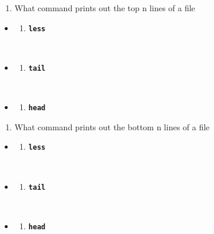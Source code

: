 \documentclass[
  letterpaper,
  DIV=11,
  numbers=noendperiod]{scrreprt}
\providecommand{\tightlist}{%
  \setlength{\itemsep}{0pt}\setlength{\parskip}{0pt}}
\begin{document}
\begin{enumerate}
\def\labelenumi{\arabic{enumi}.}
\setcounter{enumi}{4}
\tightlist
\item
  What command prints out the top n lines of a file
\end{enumerate}

\begin{itemize}
\tightlist
\item
  \begin{enumerate}
  \def\labelenumi{(\Alph{enumi})}
  \tightlist
  \item
    \textbf{\texttt{less}}\strut \\
  \end{enumerate}
\item
  \begin{enumerate}
  \def\labelenumi{(\Alph{enumi})}
  \setcounter{enumi}{1}
  \tightlist
  \item
    \textbf{\texttt{tail}}\strut \\
  \end{enumerate}
\item
  \begin{enumerate}
  \def\labelenumi{(\Alph{enumi})}
  \setcounter{enumi}{2}
  \tightlist
  \item
    \textbf{\texttt{head}}
  \end{enumerate}
\end{itemize}

\begin{enumerate}
\def\labelenumi{\arabic{enumi}.}
\setcounter{enumi}{5}
\tightlist
\item
  What command prints out the bottom n lines of a file
\end{enumerate}

\begin{itemize}
\tightlist
\item
  \begin{enumerate}
  \def\labelenumi{(\Alph{enumi})}
  \tightlist
  \item
    \textbf{\texttt{less}}\strut \\
  \end{enumerate}
\item
  \begin{enumerate}
  \def\labelenumi{(\Alph{enumi})}
  \setcounter{enumi}{1}
  \tightlist
  \item
    \textbf{\texttt{tail}}\strut \\
  \end{enumerate}
\item
  \begin{enumerate}
  \def\labelenumi{(\Alph{enumi})}
  \setcounter{enumi}{2}
  \tightlist
  \item
    \textbf{\texttt{head}}
  \end{enumerate}
\end{itemize}
\end{document}
